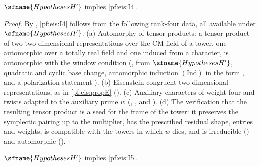 \begin{theorem}\label{pf:eis:seedIV}
$\sfname{HypothesesH'}$ implies \ref{pf:eis:I4}.
\end{theorem}

\begin{proof}
By , \ref{pf:eis:I4} follows from the following rank-four data, all available
under $\sfname{HypothesesH'}$.
(a) Automorphy of tensor products: a tensor product of two two-dimensional representations over the CM field of a tower, one automorphic
over a totally real field and one induced from a character, is automorphic with the window condition
(, from $\sfname{HypothesesH'}$, quadratic and cyclic
base change, automorphic induction $(\mathrm{Ind})$ in the form ,
and a polarization statement ).
(b) Eisenstein-congruent two-dimensional representations, as in \cref{pf:eis:propE}
().
(c) Auxiliary characters of weight four and twists adapted to the auxiliary prime $w$
(, , and ).
(d) The verification that the resulting tensor product is a seed for the frame of the tower: it preserves the symplectic pairing up to the
multiplier, has the prescribed residual shape, entries and weights, is compatible with the towers in which $w$ dies, and is irreducible
() and automorphic ().
\end{proof}

\begin{theorem}\label{pf:eis:pmex}
$\sfname{HypothesesH'}$ implies \ref{pf:eis:I5}.
\end{theorem}

